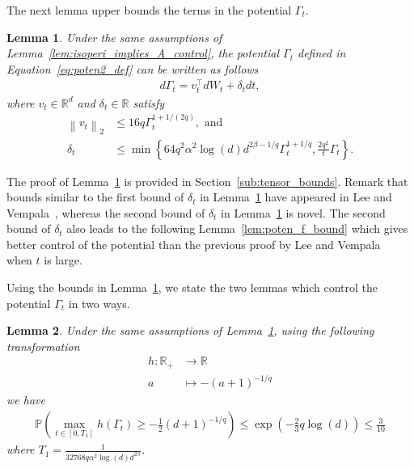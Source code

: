 \documentclass[11pt,twoside]{article}
\newcommand{\potentwo}{\Gamma}
\theoremstyle{named}
\theoremstyle{plain}
\newtheorem{lemma}{Lemma}
\newcommand{\vecnorm}[2]{\left\| #1\right\|_{#2}}
\newcommand{\Prob}{\ensuremath{{\mathbb{P}}}}
\newcommand{\usedim}{\ensuremath{d}}
\newcommand{\dims}{\usedim}
\newcommand{\real}{\ensuremath{\mathbb{R}}}
\newcommand{\parenth}[1]{\left( #1 \right)}
\newcommand{\braces}[1]{\left\{ #1 \right \}}
\newcommand{\tp}{^\top}
\begin{document}
The next lemma upper bounds the terms in the potential $\potentwo_t$.

\begin{lemma}
  \label{lem:potentwo_derivative_bound}
  Under the same assumptions of Lemma~\ref{lem:isoperi_implies_A_control}, the potential $\potentwo_t$ defined in Equation~\eqref{eq:poten2_def} can be written as follows
  \begin{align*}
    d\potentwo_t = v_t\tp dW_t + \delta_t dt,
  \end{align*}
  where $v_t \in \real^\dims$ and $\delta_t \in \real$ satisfy
  \begin{align*}
    \vecnorm{v_t}{2} &\leq 16 q \potentwo_t^{1 + 1/(2q)}, \text{ and } \\
    \delta_t &\leq \min\braces{64 q^2 \alpha^2 \log(\dims) \dims^{2\beta -1/q}\potentwo_t^{1 + 1/q}, \frac{2q^2}{t} \potentwo_t}.
  \end{align*}
\end{lemma}
The proof of Lemma~\ref{lem:potentwo_derivative_bound} is provided in Section~\ref{sub:tensor_bounds}. Remark that bounds similar to the first bound of $\delta_t$ in Lemma~\ref{lem:potentwo_derivative_bound} have appeared in Lee and Vempala~\cite{lee2016eldan}, whereas the second bound of $\delta_t$ in Lemma~\ref{lem:potentwo_derivative_bound} is novel. The second bound of $\delta_t$ also leads to the following Lemma~\ref{lem:poten_f_bound} which gives better control of the potential than the previous proof by Lee and Vempala~\cite{lee2016eldan} when $t$ is large.

Using the bounds in Lemma~\ref{lem:potentwo_derivative_bound}, we state the two lemmas which control the potential $\potentwo_t$ in two ways.
\begin{lemma}
  \label{lem:poten_h_bound}
  Under the same assumptions of Lemma~\ref{lem:potentwo_derivative_bound}, using the following transformation
  \begin{align*}
    h: \real_+ &\rightarrow \real \\
    a &\mapsto -(a+1)^{-1/q}
  \end{align*}
  we have
  \begin{align*}
    \Prob\parenth{\max_{t \in [0, T_1]} h(\potentwo_t) \geq - \frac{1}{2}\parenth{\dims+1}^{-1/q} } \leq \exp(-\frac{2}{3} q\log(\dims)) \leq \frac{3}{10}
  \end{align*}
  where $T_1 = \frac{1}{32768 q \alpha^2 \log(\dims) \dims^{2\beta}}$.
\end{lemma}
\end{document}
